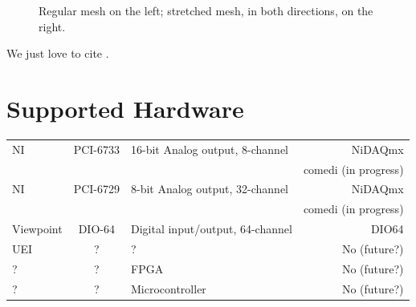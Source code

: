 \begin{figure}[hb]
    \caption{Regular mesh on the left; stretched mesh, in both directions, on
             the right.} 
    \label{fig:intro:jdk_grid_example}
\end{figure}

We just love to cite \citet{Rambo:1989}.


\section{Supported Hardware}
\begin{center}
\tablelasttail{\hline}
%
%
\begin{supertabular}{|l|c|l|r|}
  NI & PCI-6733 & 16-bit Analog output, 8-channel & NiDAQmx \\
     &          &                                 & comedi (in progress) \\
  NI & PCI-6729 & 8-bit Analog output, 32-channel & NiDAQmx \\
     &          &                                 & comedi (in progress) \\
  Viewpoint & DIO-64 & Digital input/output, 64-channel & DIO64 \\
  UEI & ? & ? & No (future?) \\
  ? & ? & FPGA & No (future?) \\
  ? & ? & Microcontroller & No (future?) \\
\end{supertabular}
\end{center}

